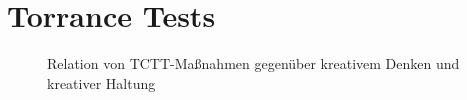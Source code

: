 \section{Torrance Tests}{
	\label{sec:torrance_tests}
	\begin{figure}[H]
		\centering
		\caption[Relation von TTCT-Maßnahmen]{Relation von TCTT-Maßnahmen gegenüber kreativem Denken und kreativer Haltung \cite{Kim2016}}
		\label{img:ttct}
	\end{figure}
}
